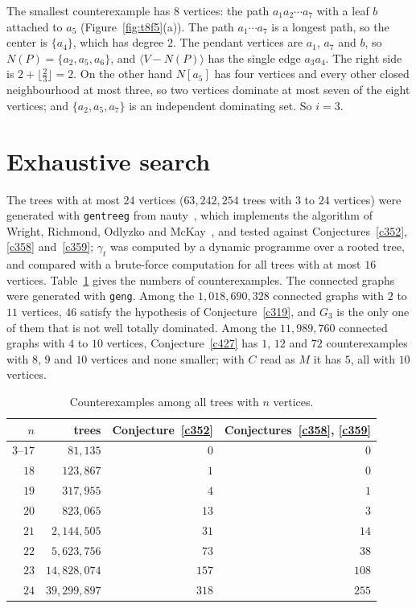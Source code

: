 \documentclass[11pt]{amsart}
\theoremstyle{definition}
\theoremstyle{remark}
\numberwithin{equation}{section}
\newcommand{\gt}{\gamma_t}
\begin{document}
The smallest counterexample has $8$ vertices: the path $a_1a_2\cdots a_7$ with a leaf $b$ attached to $a_5$ (Figure~\ref{fig:t8f5}(a)). The path $a_1\cdots a_7$ is a longest path, so the center is $\{a_4\}$, which has degree $2$. The pendant vertices are $a_1$, $a_7$ and $b$, so $N(P)=\{a_2,a_5,a_6\}$, and $\langle V-N(P)\rangle$ has the single edge $a_3a_4$. The right side is $2+\lfloor\frac23\rfloor=2$. On the other hand $N[a_5]$ has four vertices and every other closed neighbourhood at most three, so two vertices dominate at most seven of the eight vertices; and $\{a_2,a_5,a_7\}$ is an independent dominating set. So $i=3$.

\section{Exhaustive search}\label{sec:search}

The trees with at most $24$ vertices ($63{,}242{,}254$ trees with $3$ to $24$ vertices) were generated with \texttt{gentreeg} from nauty~\cite{McKayPiperno2014}, which implements the algorithm of Wright, Richmond, Odlyzko and McKay~\cite{WROM1986}, and tested against Conjectures~\ref{c352}, \ref{c358} and~\ref{c359}; $\gt$ was computed by a dynamic programme over a rooted tree, and compared with a brute-force computation for all trees with at most $16$ vertices. Table~\ref{tab:search} gives the numbers of counterexamples. The connected graphs were generated with \texttt{geng}. Among the $1{,}018{,}690{,}328$ connected graphs with $2$ to $11$ vertices, $46$ satisfy the hypothesis of Conjecture~\ref{c319}, and $G_3$ is the only one of them that is not well totally dominated. Among the $11{,}989{,}760$ connected graphs with $4$ to $10$ vertices, Conjecture~\ref{c427} has $1$, $12$ and $72$ counterexamples with $8$, $9$ and $10$ vertices and none smaller; with $C$ read as $M$ it has $5$, all with $10$ vertices.

\begin{table}[t]
\centering
\caption{Counterexamples among all trees with $n$ vertices.}
\label{tab:search}
\begin{tabular}{rrrr}
\toprule
$n$ & trees & Conjecture~\ref{c352} & Conjectures~\ref{c358}, \ref{c359}\\
\midrule
$3$--$17$ & $81{,}135$ & $0$ & $0$\\
$18$ & $123{,}867$ & $1$ & $0$\\
$19$ & $317{,}955$ & $4$ & $1$\\
$20$ & $823{,}065$ & $13$ & $3$\\
$21$ & $2{,}144{,}505$ & $31$ & $14$\\
$22$ & $5{,}623{,}756$ & $73$ & $38$\\
$23$ & $14{,}828{,}074$ & $157$ & $108$\\
$24$ & $39{,}299{,}897$ & $318$ & $255$\\
\bottomrule
\end{tabular}
\end{table}
\end{document}
